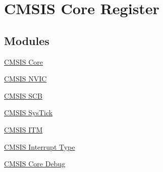 \hypertarget{group___c_m_s_i_s__core__register}{\section{\-C\-M\-S\-I\-S \-Core \-Register}
\label{group___c_m_s_i_s__core__register}
}
\subsection*{\-Modules}
\begin{DoxyCompactItemize}
\item 
\hyperlink{group___c_m_s_i_s___c_o_r_e}{\-C\-M\-S\-I\-S Core}
\item 
\hyperlink{group___c_m_s_i_s___n_v_i_c}{\-C\-M\-S\-I\-S N\-V\-I\-C}
\item 
\hyperlink{group___c_m_s_i_s___s_c_b}{\-C\-M\-S\-I\-S S\-C\-B}
\item 
\hyperlink{group___c_m_s_i_s___sys_tick}{\-C\-M\-S\-I\-S Sys\-Tick}
\item 
\hyperlink{group___c_m_s_i_s___i_t_m}{\-C\-M\-S\-I\-S I\-T\-M}
\item 
\hyperlink{group___c_m_s_i_s___interrupt_type}{\-C\-M\-S\-I\-S Interrupt Type}
\item 
\hyperlink{group___c_m_s_i_s___core_debug}{\-C\-M\-S\-I\-S Core Debug}
\end{DoxyCompactItemize}
